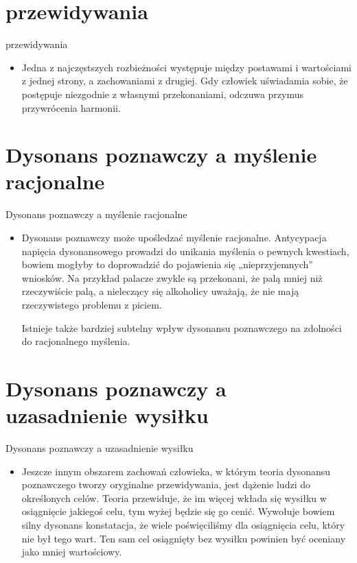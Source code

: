 \documentclass{beamer}
\begin{document}
\section{przewidywania}
\begin{frame}{przewidywania}
\begin{itemize}
\item
Jedna z najczęstszych rozbieżności występuje między postawami i wartościami z jednej strony, a zachowaniami z drugiej. Gdy człowiek uświadamia sobie, że postępuje niezgodnie z własnymi przekonaniami, odczuwa przymus przywrócenia harmonii.
\end{itemize}
\end{frame}







\section{Dysonans poznawczy a myślenie racjonalne}
\begin{frame}{Dysonans poznawczy a myślenie racjonalne}
\begin{itemize}
\item
Dysonans poznawczy może upośledzać myślenie racjonalne. Antycypacja napięcia dysonansowego prowadzi do unikania myślenia o pewnych kwestiach, bowiem mogłyby to doprowadzić do pojawienia się „nieprzyjemnych” wniosków. Na przykład palacze zwykle są przekonani, że palą mniej niż rzeczywiście palą, a nieleczący się alkoholicy uważają, że nie mają rzeczywistego problemu z piciem.

Istnieje także bardziej subtelny wpływ dysonansu poznawczego na zdolności do racjonalnego myślenia.
\end{itemize}
\end{frame}




\section{Dysonans poznawczy a uzasadnienie wysiłku}
\begin{frame}{Dysonans poznawczy a uzasadnienie wysiłku}
\begin{itemize}
\item
Jeszcze innym obszarem zachowań człowieka, w którym teoria dysonansu poznawczego tworzy oryginalne przewidywania, jest dążenie ludzi do określonych celów. Teoria przewiduje, że im więcej wkłada się wysiłku w osiągnięcie jakiegoś celu, tym wyżej będzie się go cenić. Wywołuje bowiem silny dysonans konstatacja, że wiele poświęciliśmy dla osiągnięcia celu, który nie był tego wart. Ten sam cel osiągnięty bez wysiłku powinien być oceniany jako mniej wartościowy.
\end{itemize}
\end{frame}
\end{document}
